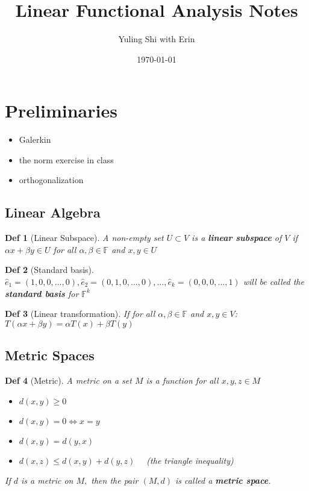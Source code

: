 \documentclass[10pt]{paper}
\title{Linear Functional Analysis Notes}
\date{\today}
\author{{\footnotesize{Yuling Shi}} with Erin}
\newtheorem{definition}{Def}[section]
\begin{document}
\maketitle
\tableofcontents
\footnotesize
\section{Preliminaries}

\begin{itemize}
    \item Galerkin
    \item the norm exercise in class
    \item orthogonalization 
\end{itemize}

\subsection{Linear Algebra}

\begin{definition}[Linear Subspace]
    A non-empty set $U \subset V$ is a \textbf{linear subspace} of $V$ if $\alpha x+\beta y \in U $ for all $\alpha, \beta \in \mathbb{F}$ and $x, y \in U$
\end{definition}

\begin{definition}[Standard basis]
    $\widehat{e}_{1}=(1,0,0, \ldots, 0), \widehat{e}_{2}=(0,1,0, \ldots, 0), \ldots, \widehat{e}_{k}=(0,0,0, \ldots, 1)$ will be called the \textbf{standard basis} for $\mathbb{F}^{k}$
\end{definition}

\begin{definition}[Linear transformation]
    If for all $\alpha, \beta \in \mathbb{F}$ and $x, y \in V$: $T(\alpha x+\beta y)=\alpha T(x)+\beta T(y)$
\end{definition}

\subsection{Metric Spaces}

\begin{definition}[Metric]
    A metric on a set $M$ is a function for all $x, y, z \in M$
    \begin{itemize}
        \item $d(x, y) \geq 0$
        \item $d(x, y)=0 \Longleftrightarrow x=y$
        \item $d(x, y)=d(y, x)$
        \item $d(x, z) \leq d(x, y)+d(y, z) \quad$ (the triangle inequality)
    \end{itemize}
    If $d$ is a metric on $M,$ then the pair $(M, d)$ is called a \textbf{metric space}.
\end{definition}
\end{document}
